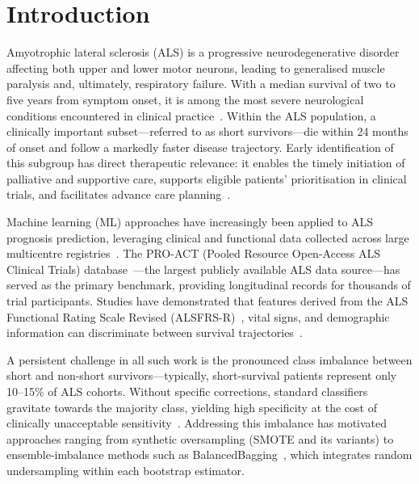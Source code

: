 \documentclass[a4paper,twoside]{article}
\begin{document}
\onecolumn \maketitle \normalsize \setcounter{footnote}{0} \vfill

\newpage

\section{Introduction}
\label{sec:intro}

Amyotrophic lateral sclerosis (ALS) is a progressive neurodegenerative disorder
affecting both upper and lower motor neurons, leading to generalised muscle
paralysis and, ultimately, respiratory failure. With a median survival of two to
five years from symptom onset, it is among the most severe neurological
conditions encountered in clinical practice~\cite{Feldman2022}. Within the ALS
population, a clinically important subset---referred to as short survivors---die
within 24 months of onset and follow a markedly faster disease trajectory. Early
identification of this subgroup has direct therapeutic relevance: it enables the
timely initiation of palliative and supportive care, supports eligible patients'
prioritisation in clinical trials, and facilitates advance care
planning~\cite{Miller2012}.

Machine learning (ML) approaches have increasingly been applied to ALS prognosis
prediction, leveraging clinical and functional data collected across large
multicentre registries~\cite{Grollemund2019,Papaiz2022}. The PRO-ACT (Pooled
Resource Open-Access ALS Clinical Trials) database~\cite{PROACT}---the largest
publicly available ALS data source---has served as the primary benchmark,
providing longitudinal records for thousands of trial participants. Studies have
demonstrated that features derived from the ALS Functional Rating Scale Revised
(ALSFRS-R)~\cite{cedarbaum1999alsfrs}, vital signs, and demographic information
can discriminate between survival trajectories~\cite{Ramamoorthy2022,Halbersberg2023}.

A persistent challenge in all such work is the pronounced class imbalance between
short and non-short survivors---typically, short-survival patients represent only
10--15\% of ALS cohorts. Without specific corrections, standard classifiers
gravitate towards the majority class, yielding high specificity at the cost of
clinically unacceptable sensitivity~\cite{chawla2002smote}. Addressing this
imbalance has motivated approaches ranging from synthetic oversampling (SMOTE and
its variants) to ensemble-imbalance methods such as
BalancedBagging~\cite{lemaitre2017}, which integrates random undersampling within
each bootstrap estimator.
\end{document}
